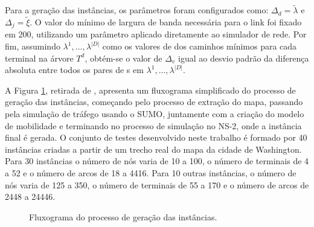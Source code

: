 Para  a  geração   das  instâncias,  os  parâmetros   foram  configurados  como:
$\Delta_{d} = \tilde{\lambda}$  e $\Delta_{j} = \tilde{\xi}$. O  valor do mínimo
de largura  de banda  necessária para o  link foi fixado  em 200,  utilizando um
parâmetro  aplicado  diretamente  ao  simulador  de  rede.  Por  fim,  assumindo
$\lambda^1,  \dots, \lambda^{|D|}$  como  os valores  de  {\delay} dos  caminhos
mínimos para cada terminal na árvore $T^d$, obtém-se o valor de $\Delta_v$ igual
ao desvio  padrão da diferença  absoluta entre todos os  pares de {\delay  s} em
$\lambda^1, \dots, \lambda^{|D|}$.

A  Figura  \ref{fig:flowchart},  retirada  de  \cite{tiago:2019},  apresenta  um
fluxograma simplificado  do processo de  geração das instâncias,  começando pelo
processo de extração do mapa, passando  pela simulação de tráfego usando o SUMO,
juntamente com  a criação do  modelo de mobilidade  e terminando no  processo de
simulação  no NS-2,  onde  a instância  final  é gerada.  O  conjunto de  testes
desenvolvido neste trabalho  é formado por 40 instâncias criadas  a partir de um
trecho real do mapa da cidade de Washington. Para 30 instâncias o número de nós
varia de 10 a 100,  o número de terminais de 4 a 52 e o  número de arcos de 18 a
4416. Para 10 outras instâncias, o número de nós varia de 125 a 350, o número de
terminais de 55 a 170 e o número de arcos de 2448 a 24446.

\begin{figure}[!ht]
    \centering
    \caption{Fluxograma do processo de geração das instâncias.}
    \label{fig:flowchart}
\end{figure}

